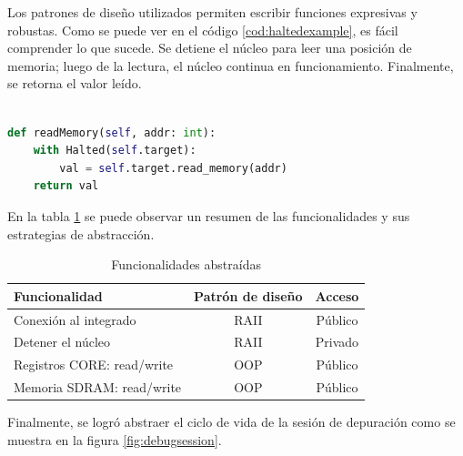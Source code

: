 Los patrones de diseño utilizados permiten escribir funciones expresivas y robustas.
Como se puede ver en el código \ref{cod:haltedexample}, es fácil comprender lo que sucede.
Se detiene el núcleo para leer una posición de memoria; luego de la lectura, el núcleo continua en funcionamiento.
Finalmente, se retorna el valor leído.

\newpage

\begin{lstlisting}[language=Python,label=cod:haltedexample,caption=Ejemplo de uso de \emph{RAII}.]  % Start your code-block

def readMemory(self, addr: int):
    with Halted(self.target):
        val = self.target.read_memory(addr)
    return val

\end{lstlisting}

En la tabla \ref{tab:funcionalidades} se puede observar un resumen de las funcionalidades y sus estrategias de abstracción.

\begin{table}[h]
	\centering
	\caption[Funcionalidades abstraidas]{Funcionalidades abstraídas}

	\begin{tabular}{l c c}    
		\toprule
        \textbf{Funcionalidad}     & \textbf{Patrón de diseño} & \textbf{Acceso}\\
		\midrule
		Conexión al integrado      & RAII                      & Público\\		
		Detener el núcleo          & RAII                      & Privado\\
		Registros CORE: read/write & OOP                       & Público\\
		Memoria SDRAM: read/write  & OOP                       & Público\\
		\bottomrule
		\hline
	\end{tabular}
	\label{tab:funcionalidades}
\end{table}

Finalmente, se logró abstraer el ciclo de vida de la sesión de depuración como se muestra en la figura \ref{fig:debugsession}.

